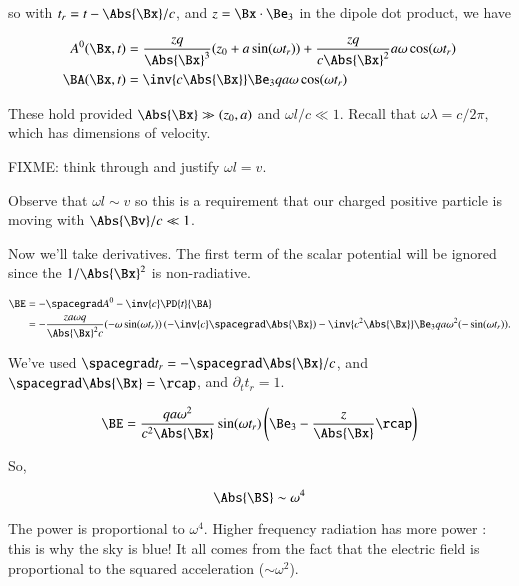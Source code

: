 so with $t_r = t - \Abs{\Bx}/c$, and $z = \Bx \cdot \Be_3$ in the dipole dot product, we have

\begin{align}\label{eqn:relativisticElectrodynamicsL20:400}
A^0(\Bx, t) &= 
\frac{z q}{\Abs{\Bx}^3} ( z_0 + a \sin(\omega t_r) ) + \frac{z q}{c \Abs{\Bx}^2} a \omega \cos(\omega t_r) \\
\BA(\Bx, t) &= \inv{c \Abs{\Bx} } \Be_3 q a \omega \cos(\omega t_r)
\end{align}

These hold provided $\Abs{\Bx} \gg (z_0, a)$ and $\omega l/c \ll 1$.  Recall that $\omega \lambda = c/2\pi$, which has dimensions of velocity.

FIXME: think through and justify $\omega l = v$.

Observe that $\omega l \sim v$ so this is a requirement that our charged positive particle is moving with $\Abs{\Bv}/c \ll 1$.

Now we'll take derivatives.  The first term of the scalar potential will be ignored since the $1/\Abs{\Bx}^2$ is non-radiative.

\begin{align*}
\BE 
&= -\spacegrad A^0 - \inv{c} \PD{t}{\BA} \\
&= -\frac{z a \omega q}{\Abs{\Bx}^2 c} (-\omega \sin(\omega t_r)) \left( - \inv{c} \spacegrad \Abs{\Bx} \right)
- \inv{c^2 \Abs{\Bx} } \Be_3 q a \omega^2 (-\sin(\omega t_r)).
\end{align*}

We've used $\spacegrad t_r = -\spacegrad \Abs{\Bx}/c$, and $\spacegrad \Abs{\Bx} = \rcap$, and $\partial_t t_r = 1$.

\begin{equation}\label{eqn:relativisticElectrodynamicsL20:420}
\BE = \frac{ q a \omega^2 }{c^2 \Abs{\Bx} } \sin(\omega t_r) \left( \Be_3 - \frac{z}{\Abs{\Bx} } \rcap \right)
\end{equation}

So,

\begin{equation}\label{eqn:relativisticElectrodynamicsL20:440}
\Abs{\BS} \sim \omega^4
\end{equation}

The power is proportional to $\omega^4$.  Higher frequency radiation has more power : this is why the sky is blue!  It all comes from the fact that the electric field is proportional to the squared acceleration ($\sim \omega^2$).

\EndArticle
